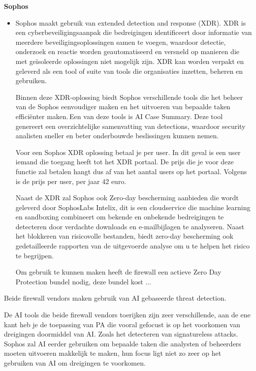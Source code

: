 \textbf{Sophos}
\begin{itemize}[label=\textbullet]
    \item Sophos maakt gebruik van extended detection and response (XDR). XDR is een cyberbeveiligingsaanpak die bedreigingen identificeert door informatie van meerdere beveiligingsoplossingen samen te voegen, waardoor detectie, onderzoek en reactie worden geautomatiseerd en versneld op manieren die met geïsoleerde oplossingen niet mogelijk zijn. XDR kan worden verpakt en geleverd als een tool of suite van tools die organisaties inzetten, beheren en gebruiken. \autocite{SophosXDR2025} 
    
    Binnen deze XDR-oplossing biedt Sophos verschillende tools die het beheer van de Sophos eenvoudiger maken en het uitvoeren van bepaalde taken efficiënter maken. Een van deze tools is AI Case Summary. Deze tool genereert een overzichtelijke samenvatting van detections, waardoor security analisten sneller en beter onderbouwde beslissingen kunnen nemen.
    
    Voor een Sophos XDR oplossing betaal je per user. In dit geval is een user iemand die toegang heeft tot het XDR portaal. De prijs die je voor deze functie zal betalen hangt dus af van het aantal users op het portaal. Volgens \textcite{Kibalna2024} is de prijs per user, per jaar 42 euro.
    
    Naast de XDR zal Sophos ook  Zero-day bescherming aanbieden die wordt geleverd door SophosLabs Intelix, dit is een cloudservice die machine learning en sandboxing combineert om bekende en onbekende bedreigingen te detecteren door verdachte downloads en e-mailbijlagen te analyseren. Naast het blokkeren van risicovolle bestanden, biedt zero-day bescherming ook gedetailleerde rapporten van de uitgevoerde analyse om u te helpen het risico te begrijpen. \autocite{SophosZD2022} 
    
    Om gebruik te kunnen maken heeft de firewall een actieve Zero Day Protection bundel nodig, deze bundel kost ...   
\end{itemize}

Beide firewall vendors maken gebruik van AI gebaseerde threat detection.


De AI tools die beide firewall vendors toerijken zijn zeer verschillende, aan de ene kant heb je de toepassing van PA die vooral gefocust is op het voorkomen van dreigingen doormiddel van AI. Zoals het detecteren van signatureless attacks. Sophos zal AI eerder gebruiken om bepaalde taken die analysten of beheerders moeten uitvoeren makkelijk te maken, hun focus ligt niet zo zeer op het gebruiken van AI om dreigingen te voorkomen.

